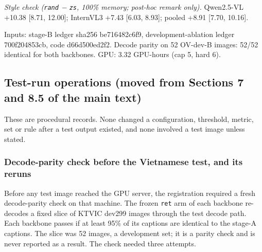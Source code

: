 \documentclass[manuscript,screen]{acmart}
\begin{document}
\emph{Style check (\texttt{rand} − \texttt{zs}, 100\% memory; post-hoc remark only).} Qwen2.5-VL
+10.38 {[}8.71, 12.00{]}; InternVL3 +7.43 {[}6.03, 8.93{]}; pooled +8.91 {[}7.70, 10.16{]}.

Inputs: stage-B ledger sha256 be716482c6f9, development-ablation ledger 700f204853cb, code
d66d500ed2f2. Decode parity on 52 OV-dev-B images: 52/52 identical for both backbones. GPU: 3.32
GPU-hours (cap 5, hard 6).

\subsection{Test-run operations (moved from Sections 7 and 8.5 of the main
text)}\label{test-run-operations-moved-from-sections-7-and-8.5-of-the-main-text}

These are procedural records. None changed a configuration, threshold, metric, set or rule after a
test output existed, and none involved a test image unless stated.

\subsubsection{Decode-parity check before the Vietnamese test, and its
reruns}\label{decode-parity-check-before-the-vietnamese-test-and-its-reruns}

Before any test image reached the GPU server, the registration required a fresh decode-parity check
on that machine. The frozen \texttt{ret} arm of each backbone re-decodes a fixed slice of KTVIC
dev299 images through the test decode path. Each backbone passes if at least 95\% of its captions
are identical to the stage-A captions. The slice was 52 images, a development set; it is a parity
check and is never reported as a result. The check needed three attempts.
\end{document}
